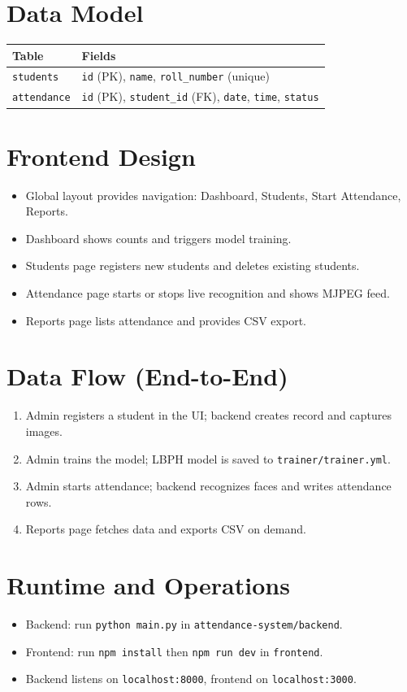 \documentclass[11pt]{article}
\begin{document}
\section*{Data Model}
\begin{longtable}{|p{}|p{}|}
\hline
\textbf{Table} & \textbf{Fields} \\\hline
\texttt{students} & \texttt{id} (PK), \texttt{name}, \texttt{roll\_number} (unique) \\\hline
\texttt{attendance} & \texttt{id} (PK), \texttt{student\_id} (FK), \texttt{date}, \texttt{time}, \texttt{status} \\\hline
\end{longtable}

\section*{Frontend Design}
\begin{itemize}[leftmargin=*]
  \item Global layout provides navigation: Dashboard, Students, Start Attendance, Reports.
  \item Dashboard shows counts and triggers model training.
  \item Students page registers new students and deletes existing students.
  \item Attendance page starts or stops live recognition and shows MJPEG feed.
  \item Reports page lists attendance and provides CSV export.
\end{itemize}

\section*{Data Flow (End-to-End)}
\begin{enumerate}[leftmargin=*]
  \item Admin registers a student in the UI; backend creates record and captures images.
  \item Admin trains the model; LBPH model is saved to \texttt{trainer/trainer.yml}.
  \item Admin starts attendance; backend recognizes faces and writes attendance rows.
  \item Reports page fetches data and exports CSV on demand.
\end{enumerate}

\section*{Runtime and Operations}
\begin{itemize}[leftmargin=*]
  \item Backend: run \texttt{python main.py} in \texttt{attendance-system/backend}.
  \item Frontend: run \texttt{npm install} then \texttt{npm run dev} in \texttt{frontend}.
  \item Backend listens on \texttt{localhost:8000}, frontend on \texttt{localhost:3000}.
\end{itemize}
\end{document}
